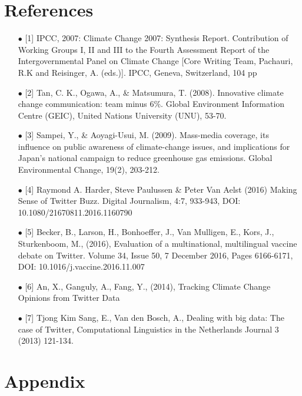 \documentclass[paper=a4, fontsize=9px]{scrartcl} %
\numberwithin{equation}{section} %
\numberwithin{figure}{section} %
\numberwithin{table}{section} %
\begin{document}
\newpage

\section{References}

\begin{itemize}
	\item[$\bullet$] [1] IPCC, 2007: Climate Change 2007: Synthesis Report. Contribution of Working Groups I, II and III to the Fourth Assessment Report of the Intergovernmental Panel on Climate Change [Core Writing Team, Pachauri, R.K and Reisinger, A. (eds.)]. IPCC, Geneva, Switzerland, 104 pp
	
	\item[$\bullet$] [2] Tan, C. K., Ogawa, A., \& Matsumura, T. (2008). Innovative climate change communication: team minus 6\%. Global Environment Information Centre (GEIC), United Nations University (UNU), 53-70.
	
	\item[$\bullet$] [3] Sampei, Y., \& Aoyagi-Usui, M. (2009). Mass-media coverage, its influence on public awareness of climate-change issues, and implications for Japan’s national campaign to reduce greenhouse gas emissions. Global Environmental Change, 19(2), 203-212.
	
	\item[$\bullet$] [4] Raymond A. Harder, Steve Paulussen \& Peter Van Aelst (2016) Making
	Sense of Twitter Buzz. Digital Journalism, 4:7, 933-943, DOI: 10.1080/21670811.2016.1160790
	
	\item[$\bullet$] [5] Becker, B., Larson, H., Bonhoeffer, J., Van Mulligen, E., Kors, J., Sturkenboom, M., (2016), Evaluation of a multinational, multilingual vaccine debate on Twitter. Volume 34, Issue 50, 7 December 2016, Pages 6166-6171, DOI: 10.1016/j.vaccine.2016.11.007
	
	\item[$\bullet$] [6] An, X., Ganguly, A., Fang, Y., (2014), Tracking Climate Change Opinions from Twitter Data
	
	\item[$\bullet$] [7] Tjong Kim Sang, E., Van den Bosch, A., Dealing with big data: The case of Twitter, Computational Linguistics in the Netherlands Journal 3 (2013) 121-134.
	
	
\end{itemize}

\newpage

\section{Appendix}
\end{document}
